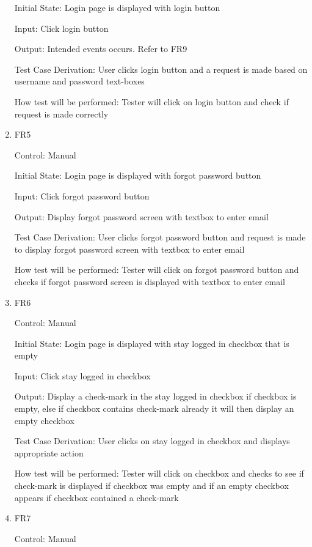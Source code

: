 \documentclass[12pt, titlepage]{article}
\begin{document}
\begin{enumerate}
Initial State: Login page is displayed with login button
					
Input: Click login button
					
Output: Intended events occurs. Refer to FR9

Test Case Derivation: User clicks login button and a request is made based on username and password text-boxes

How test will be performed: Tester will click on login button and check if request is made correctly

\item{FR5\\}

Control: Manual
					
Initial State: Login page is displayed with forgot password button
					
Input: Click forgot password button
					
Output: Display forgot password screen with textbox to enter email

Test Case Derivation: User clicks forgot password button and request is made to display forgot password screen with textbox to enter email

How test will be performed: Tester will click on forgot password button and checks if forgot password screen is displayed with textbox to enter email

\item{FR6\\}

Control: Manual
					
Initial State: Login page is displayed with stay logged in checkbox that is empty
					
Input: Click stay logged in checkbox
					
Output: Display a check-mark in the stay logged in checkbox if checkbox is empty, else if checkbox contains check-mark already it will then display an empty checkbox

Test Case Derivation: User clicks on stay logged in checkbox and displays appropriate action

How test will be performed: Tester will click on checkbox and checks to see if check-mark is displayed if checkbox was empty and if an empty checkbox appears if checkbox contained a check-mark

\item{FR7\\}

Control: Manual
					

\end{enumerate}
\end{document}
